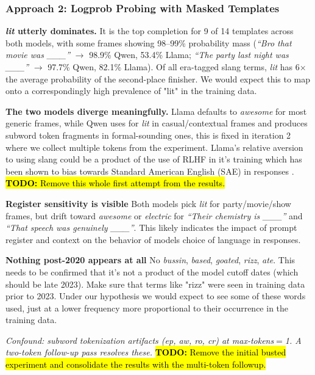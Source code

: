 \documentclass[11pt]{article}
\newcommand{\todo}[1]{\hl{\textbf{TODO:} #1}}
\begin{document}
\subsubsection{Approach 2: Logprob Probing with Masked Templates}

\textbf{\textit{lit} utterly dominates.} It is the top completion for 9 of 14 templates across both models, with some frames showing 98--99\% probability mass (\textit{``Bro that movie was \_\_\_''} $\to$ 98.9\%
Qwen, 53.4\% Llama; \textit{``The party last night was \_\_\_''} $\to$ 97.7\% Qwen, 82.1\% Llama). Of all era-tagged slang terms, \textit{lit} has 6$\times$ the average probability of the second-place finisher. We would expect this to map onto a correspondingly high prevalence of "lit" in the training data.

\textbf{The two models diverge meaningfully.} Llama defaults to \textit{awesome} for most generic frames, while Qwen uses for \textit{lit} in casual/contextual frames and produces subword token fragments in formal-sounding ones, this is fixed in iteration 2 where we collect multiple tokens from the experiment. Llama's relative aversion to using slang could be a product of the use of RLHF in it's training which has been shown to bias towards Standard American English (SAE) in responses \cite{barnhart2025rlhf}. \todo{Remove this whole first attempt from the results.}

\textbf{Register sensitivity is visible} Both models pick \textit{lit} for party/movie/show frames, but drift toward \textit{awesome} or \textit{electric} for \textit{``Their chemistry is \_\_\_''} and
\textit{``That speech was genuinely \_\_\_''}. This likely indicates the impact of prompt register and context on the behavior of models choice of language in responses.

\textbf{Nothing post-2020 appears at all} No \textit{bussin}, \textit{based}, \textit{goated}, \textit{rizz}, \textit{ate}. This needs to be confirmed that it's not a product of the model cutoff dates (which should be late 2023). Make sure that terms like "rizz" were seen in training data prior to 2023. Under our hypothesis we would expect to see some of these words used, just at a lower frequency more proportional to their occurrence in the training data.

\noindent\textit{Confound: subword tokenization artifacts (ep, aw, ro, cr) at max-tokens$=$1. A two-token follow-up pass resolves these.} \todo{Remove the initial busted experiment and consolidate the results with the multi-token followup.}
\end{document}
